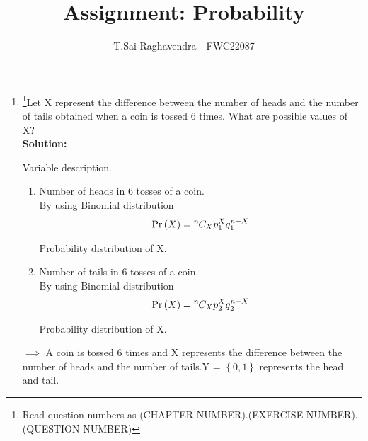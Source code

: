 \documentclass{article}
\providecommand{\pr}[1]{\ensuremath{\Pr\left(#1\right)}}
\providecommand{\brak}[1]{\ensuremath{\left\{#1\right\}}}
\newcommand*{\permcomb}[4][0mu]{{{}^{#3}\mkern#1#2_{#4}}}
\newcommand*{\comb}[1][-1mu]{\permcomb[#1]{C}}
\newcommand{\solution}{\noindent \textbf{Solution: }}
\begin{document}
\title{Assignment: Probability}
\author{\Large T.Sai Raghavendra - FWC22087}
\date{}


\maketitle
\begin{enumerate}[label=13.\arabic{enumi}.\arabic{enumii}]%
\setcounter{enumi}{3}
\setcounter{enumii}{3}

\item \footnote{Read question numbers as (CHAPTER NUMBER).(EXERCISE NUMBER).(QUESTION NUMBER)}Let X represent the difference between the number of heads and the number of tails obtained when a coin is tossed 6 times. What are possible values of X?\\

\solution

	\begin{table}[h]
	\centering
	
	\caption{Variable description.}
	\label{tables:13.4.3.2}
	\end{table}
	
\begin{enumerate}
\item Number of heads in 6 tosses of a coin.\\
By using Binomial distribution
\begin{align}
\pr{X} = \comb{n}{X}p_1^{X}q_1^{n-X}
\end{align}
	\begin{table}[h]
	\centering
	
	\caption{Probability distribution of X.}
	\label{tables:13.4.3.2}
	\end{table}
\item Number of tails in 6 tosses of a coin.\\
By using Binomial distribution
\begin{align}
\pr{X} = \comb{n}{X}p_2^{X}q_2^{n-X}
\end{align}
	\begin{table}[h]
	\centering
	
	\caption{Probability distribution of X.}
	\label{tables:13.4.3.2}
	\end{table}
\end{enumerate}


$\implies$ A coin is tossed 6 times and X represents the difference between the number of heads and the number of tails.Y = $\brak{0,1}$ represents the head and tail.\\


\end{enumerate}
\end{document}
